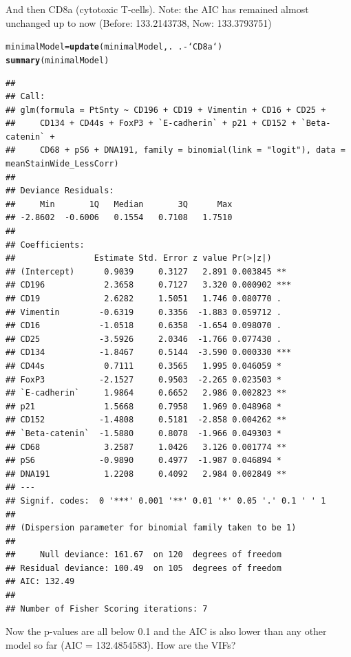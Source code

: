 \documentclass[a4paper]{article}\usepackage[]{graphicx}\usepackage[]{color}
\makeatletter
\newcommand{\hlopt}[1]{\textcolor[rgb]{0,0,0}{#1}}%
\newcommand{\hlstd}[1]{\textcolor[rgb]{0.345,0.345,0.345}{#1}}%
\newcommand{\hlkwb}[1]{\textcolor[rgb]{0.69,0.353,0.396}{#1}}%
\newcommand{\hlkwd}[1]{\textcolor[rgb]{0.737,0.353,0.396}{\textbf{#1}}}%
\newenvironment{kframe}{%
 \def\at@end@of@kframe{}%
 \ifinner\ifhmode%
  \def\at@end@of@kframe{\end{minipage}}%
  \begin{minipage}{\columnwidth}%
 \fi\fi%
 \def\FrameCommand##1{\hskip\@totalleftmargin \hskip-\fboxsep
 \colorbox{shadecolor}{##1}\hskip-\fboxsep
     \hskip-\linewidth \hskip-\@totalleftmargin \hskip\columnwidth}%
 \MakeFramed {\advance\hsize-\width
   \@totalleftmargin\z@ \linewidth\hsize
   \@setminipage}}%
 {\par\unskip\endMakeFramed%
 \at@end@of@kframe}
\newenvironment{knitrout}{}{} %
\makeatother
\begin{document}
And then CD8a (cytotoxic T-cells). Note: the AIC has remained almost unchanged up to now (Before: 133.2143738, Now: 133.3793751)
\begin{knitrout}
\color{fgcolor}\begin{kframe}
\begin{alltt}
\hlstd{minimalModel} \hlkwb{=} \hlkwd{update}\hlstd{(minimalModel,.}\hlopt{~}\hlstd{.}\hlopt{-}\hlstd{`CD8a`)}
\hlkwd{summary}\hlstd{(minimalModel)}
\end{alltt}
\begin{verbatim}
## 
## Call:
## glm(formula = PtSnty ~ CD196 + CD19 + Vimentin + CD16 + CD25 + 
##     CD134 + CD44s + FoxP3 + `E-cadherin` + p21 + CD152 + `Beta-catenin` + 
##     CD68 + pS6 + DNA191, family = binomial(link = "logit"), data = meanStainWide_LessCorr)
## 
## Deviance Residuals: 
##     Min       1Q   Median       3Q      Max  
## -2.8602  -0.6006   0.1554   0.7108   1.7510  
## 
## Coefficients:
##                Estimate Std. Error z value Pr(>|z|)    
## (Intercept)      0.9039     0.3127   2.891 0.003845 ** 
## CD196            2.3658     0.7127   3.320 0.000902 ***
## CD19             2.6282     1.5051   1.746 0.080770 .  
## Vimentin        -0.6319     0.3356  -1.883 0.059712 .  
## CD16            -1.0518     0.6358  -1.654 0.098070 .  
## CD25            -3.5926     2.0346  -1.766 0.077430 .  
## CD134           -1.8467     0.5144  -3.590 0.000330 ***
## CD44s            0.7111     0.3565   1.995 0.046059 *  
## FoxP3           -2.1527     0.9503  -2.265 0.023503 *  
## `E-cadherin`     1.9864     0.6652   2.986 0.002823 ** 
## p21              1.5668     0.7958   1.969 0.048968 *  
## CD152           -1.4808     0.5181  -2.858 0.004262 ** 
## `Beta-catenin`  -1.5880     0.8078  -1.966 0.049303 *  
## CD68             3.2587     1.0426   3.126 0.001774 ** 
## pS6             -0.9890     0.4977  -1.987 0.046894 *  
## DNA191           1.2208     0.4092   2.984 0.002849 ** 
## ---
## Signif. codes:  0 '***' 0.001 '**' 0.01 '*' 0.05 '.' 0.1 ' ' 1
## 
## (Dispersion parameter for binomial family taken to be 1)
## 
##     Null deviance: 161.67  on 120  degrees of freedom
## Residual deviance: 100.49  on 105  degrees of freedom
## AIC: 132.49
## 
## Number of Fisher Scoring iterations: 7
\end{verbatim}
\end{kframe}
\end{knitrout}

Now the p-values are all below 0.1 and the AIC is also lower than any other model so far (AIC = 132.4854583). How are the VIFs?
\end{document}
